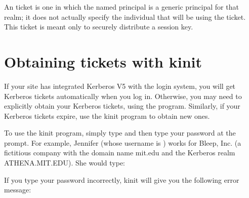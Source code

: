 \documentclass[letterpaper,10pt,english]{sphinxmanual}
\begin{document}
An  ticket is one in which the named principal is a
generic principal for that realm; it does not actually specify the
individual that will be using the ticket.  This ticket is meant only
to securely distribute a session key.


\section{Obtaining tickets with kinit}
\label{\detokenize{user/tkt_mgmt:obtaining-tickets-with-kinit}}\label{\detokenize{user/tkt_mgmt:obtain-tkt}}
If your site has integrated Kerberos V5 with the login system, you
will get Kerberos tickets automatically when you log in.  Otherwise,
you may need to explicitly obtain your Kerberos tickets, using the
{\hyperref[\detokenize{user/user_commands/kinit:kinit-1}]{}} program.  Similarly, if your Kerberos tickets expire,
use the kinit program to obtain new ones.

To use the kinit program, simply type  and then type your
password at the prompt. For example, Jennifer (whose username is
) works for Bleep, Inc. (a fictitious company with the
domain name mit.edu and the Kerberos realm ATHENA.MIT.EDU).  She would
type:

%
\begin{sphinxVerbatim}[commandchars=\\\{\}]
 
    \PYG{p}{[} \PYG{l+s+s1}{s password here.]}
\end{sphinxVerbatim}

If you type your password incorrectly, kinit will give you the
following error message:

%
\begin{sphinxVerbatim}[commandchars=\\\{\}]
 
    \PYG{p}{[}    \PYG{p}{]}
  
\end{sphinxVerbatim}
\end{document}
